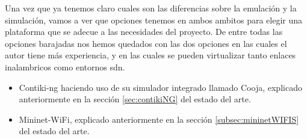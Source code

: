 Una vez que ya tenemos claro cuales son las diferencias sobre la emulación y la simulación, vamos a ver que opciones tenemos en ambos ambitos para elegir una plataforma que se adecue a las necesidades del proyecto. De entre todas las opciones barajadas nos hemos quedados con las dos opciones en las cuales el autor tiene más experiencia, y en las cuales se pueden virtualizar tanto enlaces inalambricos como entornos \gls{sdn}.

\begin{itemize}
    \item Contiki-ng haciendo uso de su simulador integrado llamado Cooja, explicado anteriormente en la sección \ref{sec:contikiNG} del estado del arte.

    \item Mininet-WiFi, explicado anteriormente en la sección \ref{subsec:mininetWIFIS} del estado del arte.
\end{itemize}

